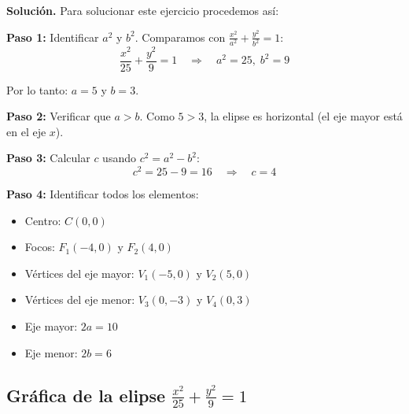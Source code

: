 \documentclass[12pt,a4paper]{article}
\begin{document}
	\textbf{Solución.} Para solucionar este ejercicio procedemos así:

	\bigskip

	\textbf{Paso 1:} Identificar $a^2$ y $b^2$. Comparamos con $\displaystyle\frac{x^2}{a^2}+\frac{y^2}{b^2}=1$:
	\[
	\frac{x^2}{25}+\frac{y^2}{9}=1 \quad\Rightarrow\quad a^2=25,\;b^2=9
	\]

	Por lo tanto: $a=5$ y $b=3$.

	\textbf{Paso 2:} Verificar que $a>b$. Como $5>3$, la elipse es horizontal (el eje mayor está en el eje $x$).

	\textbf{Paso 3:} Calcular $c$ usando $c^2=a^2-b^2$:
	\[
	c^2=25-9=16 \quad\Rightarrow\quad c=4
	\]

	\textbf{Paso 4:} Identificar todos los elementos:
	\begin{itemize}
		\item Centro: $\boxed{C(0,0)}$
		\item Focos: $\boxed{F_1(-4,0)\text{ y }F_2(4,0)}$
		\item Vértices del eje mayor: $\boxed{V_1(-5,0)\text{ y }V_2(5,0)}$
		\item Vértices del eje menor: $\boxed{V_3(0,-3)\text{ y }V_4(0,3)}$
		\item Eje mayor: $2a=\boxed{10}$
		\item Eje menor: $2b=\boxed{6}$
	\end{itemize}

	\subsection*{Gráfica de la elipse $\displaystyle\frac{x^2}{25}+\frac{y^2}{9}=1$}
\end{document}
